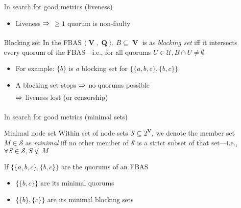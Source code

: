 \documentclass{beamer}
\DeclareMathOperator{\V}{\mathbf{V}}
\DeclareMathOperator{\Q}{\mathbf{Q}}
\renewcommand{\S}{\mathcal{S}}
\newcommand{\U}{\mathcal{U}}
\newcommand{\Arrow}[1][]{$\xRightarrow{\text{#1}}$ }
\newcommand{\Darrow}{$\Leftrightarrow$ }
\begin{document}
\begin{frame}{In search for good metrics (liveness)}
  \begin{itemize}
    \item Liveness \Arrow $\ge1$ quorum is non-faulty
  \end{itemize}
  \begin{block}{Blocking set}
    In the FBAS $\langle \V, \Q \rangle$,
    $B \subseteq \V$ is as \emph{blocking set} iff
    it intersects every quorum of the FBAS---i.e.,
    for all quorums $U \in \U, B \cap U \neq \emptyset$
  \end{block}
  \begin{itemize}
    \item For example: $\{b\}$ is \emph{a} blocking set for $\{\{a,b,c\},\{b,c\}\}$
    \item A blocking set stops \Arrow no quorums possible\\\Arrow liveness lost (or censorship)
  \end{itemize}
\end{frame}

\begin{frame}{In search for good metrics (minimal sets)}
  \begin{block}{Minimal node set}%
    Within set of node sets $\S \subseteq 2^{\V}$,
    we denote the member set $M \in \S$ as \emph{minimal} iff
    no other member of $\S$ is a strict subset of that set---i.e.,
    $\forall S \in \S, S \not\subseteq M$
  \end{block}
  If $\{\{a,b,c\},\{b,c\}\}$ are the quorums of an FBAS
  \begin{itemize}
    \item $\{\{b, c\}\}$ are its \alert{minimal quorums}
    \item $\{\{b\}, \{c\}\}$ are its \alert{minimal blocking sets}
  \end{itemize}


\end{frame}
\end{document}
